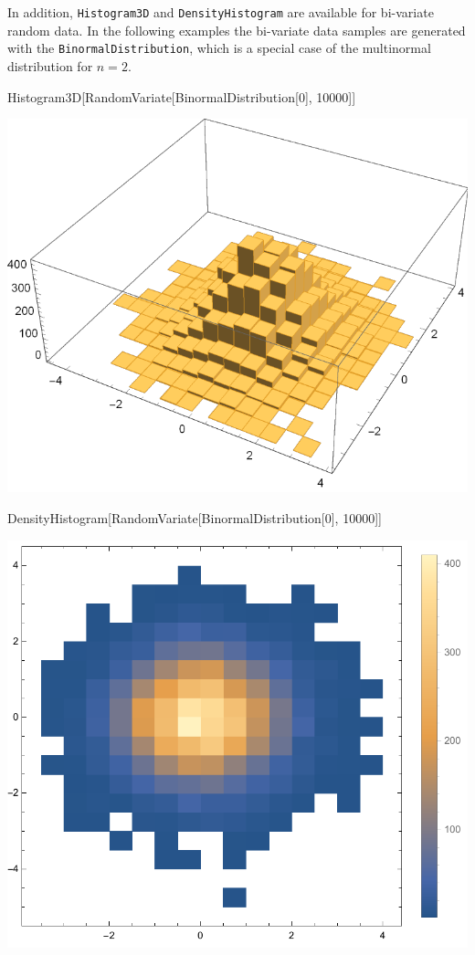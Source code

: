 \documentclass{tstextbook}
\begin{document}
In addition, \texttt{Histogram3D} and \texttt{DensityHistogram} are available for bi-variate random data. In the following examples the bi-variate data samples are generated with the \texttt{BinormalDistribution}, which is a special case of the multinormal distribution for $n=2$.

\begin{mathematica}
Histogram3D[RandomVariate[BinormalDistribution[0], 10000]]
\end{mathematica}

 \includegraphics[scale=0.8]{images/histogram_3d.pdf}
 
 \begin{mathematica}
DensityHistogram[RandomVariate[BinormalDistribution[0], 10000]]
\end{mathematica}

 \includegraphics[scale=0.8]{images/density_histogram.pdf}     
  
\end{document}
